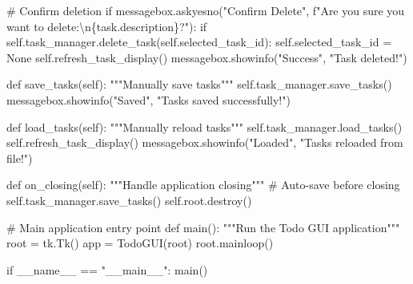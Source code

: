 \documentclass[
  letterpaper,
  DIV=11,
  numbers=noendperiod,
  oneside]{scrreprt}
\newenvironment{Shaded}{}{}
\newcommand{\CharTok}[1]{\textcolor[rgb]{0.01,0.18,0.38}{#1}}
\newcommand{\CommentTok}[1]{\textcolor[rgb]{0.42,0.45,0.49}{#1}}
\newcommand{\ControlFlowTok}[1]{\textcolor[rgb]{0.84,0.23,0.29}{#1}}
\newcommand{\KeywordTok}[1]{\textcolor[rgb]{0.84,0.23,0.29}{#1}}
\newcommand{\NormalTok}[1]{\textcolor[rgb]{0.14,0.16,0.18}{#1}}
\newcommand{\OperatorTok}[1]{\textcolor[rgb]{0.14,0.16,0.18}{#1}}
\newcommand{\SpecialCharTok}[1]{\textcolor[rgb]{0.00,0.36,0.77}{#1}}
\newcommand{\SpecialStringTok}[1]{\textcolor[rgb]{0.01,0.18,0.38}{#1}}
\newcommand{\StringTok}[1]{\textcolor[rgb]{0.01,0.18,0.38}{#1}}
\newcommand{\VariableTok}[1]{\textcolor[rgb]{0.89,0.38,0.04}{#1}}
\begin{document}
\begin{Shaded}
\begin{Highlighting}[]
        \CommentTok{\# Confirm deletion}
        \ControlFlowTok{if}\NormalTok{ messagebox.askyesno(}\StringTok{"Confirm Delete"}\NormalTok{, }
                              \SpecialStringTok{f"Are you sure you want to delete:}\CharTok{\textbackslash{}n}\SpecialStringTok{\textquotesingle{}}\SpecialCharTok{\{}\NormalTok{task}\SpecialCharTok{.}\NormalTok{description}\SpecialCharTok{\}}\SpecialStringTok{\textquotesingle{}?"}\NormalTok{):}
            \ControlFlowTok{if} \VariableTok{self}\NormalTok{.task\_manager.delete\_task(}\VariableTok{self}\NormalTok{.selected\_task\_id):}
                \VariableTok{self}\NormalTok{.selected\_task\_id }\OperatorTok{=} \VariableTok{None}
                \VariableTok{self}\NormalTok{.refresh\_task\_display()}
\NormalTok{                messagebox.showinfo(}\StringTok{"Success"}\NormalTok{, }\StringTok{"Task deleted!"}\NormalTok{)}
    
    \KeywordTok{def}\NormalTok{ save\_tasks(}\VariableTok{self}\NormalTok{):}
        \CommentTok{"""Manually save tasks"""}
        \VariableTok{self}\NormalTok{.task\_manager.save\_tasks()}
\NormalTok{        messagebox.showinfo(}\StringTok{"Saved"}\NormalTok{, }\StringTok{"Tasks saved successfully!"}\NormalTok{)}
    
    \KeywordTok{def}\NormalTok{ load\_tasks(}\VariableTok{self}\NormalTok{):}
        \CommentTok{"""Manually reload tasks"""}
        \VariableTok{self}\NormalTok{.task\_manager.load\_tasks()}
        \VariableTok{self}\NormalTok{.refresh\_task\_display()}
\NormalTok{        messagebox.showinfo(}\StringTok{"Loaded"}\NormalTok{, }\StringTok{"Tasks reloaded from file!"}\NormalTok{)}
    
    \KeywordTok{def}\NormalTok{ on\_closing(}\VariableTok{self}\NormalTok{):}
        \CommentTok{"""Handle application closing"""}
        \CommentTok{\# Auto{-}save before closing}
        \VariableTok{self}\NormalTok{.task\_manager.save\_tasks()}
        \VariableTok{self}\NormalTok{.root.destroy()}

\CommentTok{\# Main application entry point}
\KeywordTok{def}\NormalTok{ main():}
    \CommentTok{"""Run the Todo GUI application"""}
\NormalTok{    root }\OperatorTok{=}\NormalTok{ tk.Tk()}
\NormalTok{    app }\OperatorTok{=}\NormalTok{ TodoGUI(root)}
\NormalTok{    root.mainloop()}

\ControlFlowTok{if} \VariableTok{\_\_name\_\_} \OperatorTok{==} \StringTok{"\_\_main\_\_"}\NormalTok{:}
\NormalTok{    main()}
\end{Highlighting}
\end{Shaded}
\end{document}
